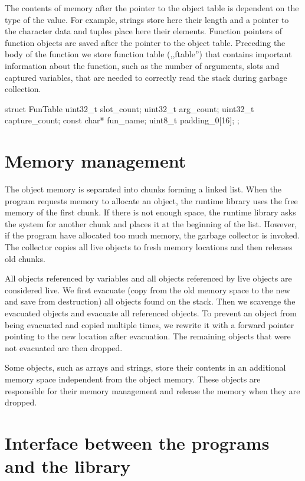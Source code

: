 The contents of memory after the pointer to the object table is dependent on the
type of the value. For example, strings store here their length and a pointer to the
character data and tuples place here their elements. Function pointers of
function objects are saved after the pointer to the object table. Preceding the
body of the function we store function table (,,ftable'') that contains
important information about the function, such as the number of arguments, slots
and captured variables, that are needed to correctly read the stack during
garbage collection.

\begin{cplusplus}
  struct FunTable {
    uint32_t slot_count;
    uint32_t arg_count;
    uint32_t capture_count;
    const char* fun_name;
    uint8_t padding_0[16];
  };
\end{cplusplus}

\section{Memory management}

The object memory is separated into chunks forming a linked list. When the
program requests memory to allocate an object, the runtime library uses the
free memory of the first chunk. If there is not enough space, the runtime
library asks the system for another chunk and places it at the beginning of the
list. However, if the program have allocated too much memory, the garbage
collector is invoked. The collector copies all live objects to fresh memory
locations and then releases old chunks.

All objects referenced by variables and all objects referenced by live objects
are considered live. We first evacuate (copy from the old memory space to the
new and save from destruction) all objects found on the stack. Then we scavenge
the evacuated objects and evacuate all referenced objects. To prevent an object
from being evacuated and copied multiple times, we rewrite it with a forward
pointer pointing to the new location after evacuation. The remaining objects
that were not evacuated are then dropped.

Some objects, such as arrays and strings, store their contents in an additional
memory space independent from the object memory. These objects are responsible
for their memory management and release the memory when they are dropped.

\section{Interface between the programs and the library}


